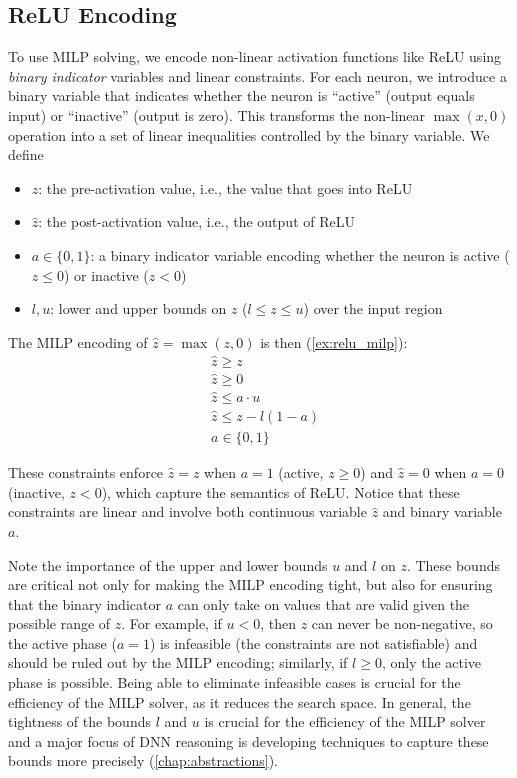\documentclass[oneside,11pt,dvipsnames]{book}
\numberwithin{equation}{section}
\theoremstyle{definition}
\theoremstyle{remark}
\begin{document}
\subsection{ReLU Encoding}\label{sec:relu-encoding}

To use MILP solving, we encode non-linear activation functions like ReLU using \emph{binary indicator} variables and linear constraints. For each neuron, we introduce a binary variable that indicates whether the neuron is ``active'' (output equals input) or ``inactive'' (output is zero). This transforms the non-linear $\max(x,0)$ operation into a set of linear inequalities controlled by the binary variable. 
We define 

\begin{itemize}
    \item $z$: the pre-activation value, i.e., the value that goes into ReLU
    \item $\hat{z}$: the post-activation value, i.e., the output of ReLU
    \item $a \in \{0,1\}$: a binary indicator variable encoding whether the neuron is active ($z \le 0$) or inactive ($z < 0$)
    \item $l, u$: lower and upper bounds on $z$ ($l \leq z \leq u$) over the input region 
\end{itemize}

The MILP encoding of $\hat{z} = \max(z, 0)$ is then (\autoref{ex:relu_milp}):
\begin{align*}
    &\hat{z} \geq z \\
    &\hat{z} \geq 0 \\
    &\hat{z} \leq a \cdot u \\
    &\hat{z} \leq z - l(1-a) \\
    &a \in \{0,1\}
\end{align*}

These constraints enforce $\hat{z} = z$ when $a = 1$ (active, $z \geq 0$) and $\hat{z} = 0$ when $a = 0$ (inactive, $z < 0$), which capture the semantics of ReLU. Notice that these constraints are linear and involve both continuous variable $\hat{z}$ and binary variable $a$.



Note the importance of the upper and lower bounds $u$ and $l$ on $z$. These bounds are critical not only for making the MILP encoding tight, but also for ensuring that the binary indicator $a$ can only take on values that are valid given the possible range of $z$. For example, if $u < 0$, then $z$ can never be non-negative, so the active phase ($a=1$) is infeasible (the constraints are not satisfiable) and should be ruled out by the MILP encoding; similarly, if $l \geq 0$, only the active phase is possible. Being able to eliminate infeasible cases is crucial for the efficiency of the MILP solver, as it reduces the search space. In general, the tightness of the bounds $l$ and $u$ is crucial for the efficiency of the MILP solver and a major focus of DNN reasoning is developing techniques to capture these bounds more precisely (\autoref{chap:abstractions}).
\end{document}
